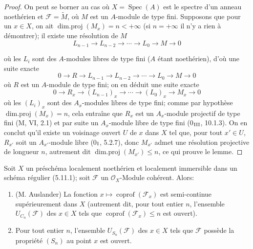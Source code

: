 \begin{proof}
On peut se borner au cas où $X=\operatorname{Spec}(A)$ est le spectre d'un
anneau noethérien et $\mathcal F=\widetilde M$, où $M$ est un $A$-module de
type fini. Supposons que pour un $x\in X$, on ait
$\operatorname{dim.proj}(M_x)=n<+\infty$ (si $n=+\infty$ il n'y a rien à
démontrer); il existe une résolution de $M$
\[
L_{n-1}\longrightarrow L_{n-2}\longrightarrow\cdots
\longrightarrow L_0\longrightarrow M\longrightarrow0
\]


où les $L_i$ sont des $A$-modules libres de type fini ($A$ étant
noethérien), d'où une suite exacte
\[
0\longrightarrow R\longrightarrow L_{n-1}\longrightarrow L_{n-2}
\longrightarrow\cdots\longrightarrow L_0\longrightarrow M
\longrightarrow0
\]
où $R$ est un $A$-module de type fini; on en déduit une suite exacte
\[
0\longrightarrow R_x\longrightarrow(L_{n-1})_x\longrightarrow\cdots
\longrightarrow(L_0)_x\longrightarrow M_x\longrightarrow0
\]
où les $(L_i)_x$ sont des $A_x$-modules libres de type fini; comme par
hypothèse $\operatorname{dim.proj}(M_x)=n$, cela entraîne que $R_x$ est un
$A_x$-module projectif de type fini (M, VI, 2.1) et par suite un
$A_x$-module libre de type fini (0$_{\rm III}$, 10.1.3). On en conclut qu'il
existe un voisinage ouvert $U$ de $x$ dans $X$ tel que, pour tout
$x'\in U$, $R_{x'}$ soit un $A_{x'}$-module libre (0$_{\rm I}$, 5.2.7),
donc $M_{x'}$ admet une résolution projective de longueur $n$, autrement
dit $\operatorname{dim.proj}(M_{x'})\leq n$, ce qui prouve le lemme.
\end{proof}

\begin{proposition}[6.11.2]
\label{IV.2.s6.11.2-fr}
Soit $X$ un préschéma localement noethérien et localement immersible dans
un schéma régulier (5.11.1); soit $\mathcal F$ un $\mathcal O_X$-Module
cohérent. Alors:
\begin{enumerate}
\item[(i)] (M. Auslander) La fonction
$x\mapsto\operatorname{coprof}(\mathcal F_x)$ est semi-continue
supérieurement dans $X$ (autrement dit, pour tout entier $n$, l'ensemble
$U_{C_n}(\mathcal F)$ des $x\in X$ tels que
$\operatorname{coprof}(\mathcal F_x)\leq n$ est ouvert).
\item[(ii)] Pour tout entier $n$, l'ensemble $U_{S_n}(\mathcal F)$ des
$x\in X$ tels que $\mathcal F$ possède la propriété $(S_n)$ au point $x$
est ouvert.
\end{enumerate}
\end{proposition}

